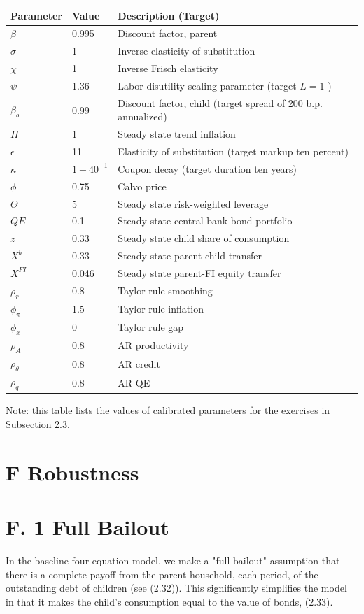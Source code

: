 \documentclass[10pt]{article}
\begin{document}
\begin{center}
\begin{tabular}{lll}
\hline\hline
Parameter & Value & Description (Target) \\
\hline
$\beta$ & 0.995 & Discount factor, parent \\
$\sigma$ & 1 & Inverse elasticity of substitution \\
$\chi$ & 1 & Inverse Frisch elasticity \\
$\psi$ & 1.36 & Labor disutility scaling parameter (target $L=1$ ) \\
$\beta_{b}$ & 0.99 & Discount factor, child (target spread of 200 b.p. annualized) \\
$\Pi$ & 1 & Steady state trend inflation \\
$\epsilon$ & 11 & Elasticity of substitution (target markup ten percent) \\
$\kappa$ & $1-40^{-1}$ & Coupon decay (target duration ten years) \\
$\phi$ & 0.75 & Calvo price \\
$\Theta$ & 5 & Steady state risk-weighted leverage \\
$Q E$ & 0.1 & Steady state central bank bond portfolio \\
$z$ & 0.33 & Steady state child share of consumption \\
$X^{b}$ & 0.33 & Steady state parent-child transfer \\
$X^{F I}$ & 0.046 & Steady state parent-FI equity transfer \\
$\rho_{r}$ & 0.8 & Taylor rule smoothing \\
$\phi_{\pi}$ & 1.5 & Taylor rule inflation \\
$\phi_{x}$ & 0 & Taylor rule gap \\
$\rho_{A}$ & 0.8 & AR productivity \\
$\rho_{\theta}$ & 0.8 & AR credit \\
$\rho_{q}$ & 0.8 & AR QE \\
\hline\hline
\end{tabular}
\end{center}

Note: this table lists the values of calibrated parameters for the exercises in Subsection 2.3.

\section*{F Robustness}
\section*{F. 1 Full Bailout}
In the baseline four equation model, we make a "full bailout" assumption that there is a complete payoff from the parent household, each period, of the outstanding debt of children (see (2.32)). This significantly simplifies the model in that it makes the child's consumption equal to the value of bonds, (2.33).
\end{document}
